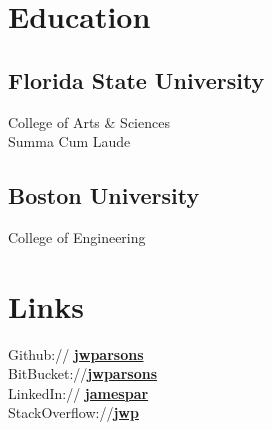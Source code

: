 \documentclass[]{deedy_resume}
\begin{document}
%
%
\lastupdated

%
%

%
%

\begin{minipage}[t]{0.36\textwidth} 


\section{Education} 
\subsection{Florida State University}
College of Arts \& Sciences\\
Summa Cum Laude\\
\sectionsep

\subsection{Boston University}
College of Engineering \\
\sectionsep


\section{Links} 
Github:// \href{https://github.com/jwparsons}{\bf jwparsons} \\
BitBucket://\href{https://bitbucket.org/jwparsons/}{\bf jwparsons} \\
LinkedIn://  \href{https://www.linkedin.com/in/jamespar/}{\bf jamespar} \\
StackOverflow://\href{https://stackoverflow.com/users/9915449/jwp}{\bf jwp}
\sectionsep


\end{minipage}
\end{document}
